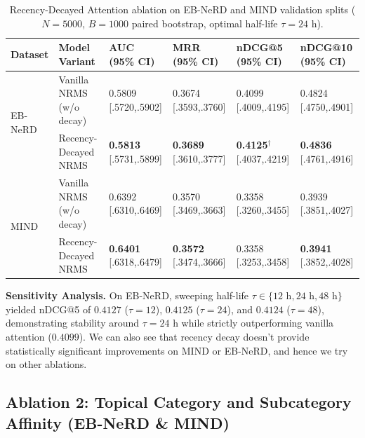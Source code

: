 \documentclass[11pt,a4paper]{article}
\begin{document}
\begin{table}[h!]
  \centering
  \caption{Recency-Decayed Attention ablation on EB-NeRD and MIND validation splits ($N{=}5000$, $B{=}1000$ paired bootstrap, optimal half-life $\tau = 24\text{ h}$).}
  \label{tab:recency_results}
  \vspace{-2pt}
  \small\setlength{\tabcolsep}{3pt}
  \begin{tabularx}{\linewidth}{l l X X X X}
    \toprule
    \textbf{Dataset} & \textbf{Model Variant} & \textbf{AUC (95\% CI)} & \textbf{MRR (95\% CI)} & \textbf{nDCG@5 (95\% CI)} & \textbf{nDCG@10 (95\% CI)} \\
    \midrule
    \multirow{2}{*}{EB-NeRD} 
      & Vanilla NRMS (w/o decay) & 0.5809 [.5720,.5902] & 0.3674 [.3593,.3760] & 0.4099 [.4009,.4195] & 0.4824 [.4750,.4901] \\
      & Recency-Decayed NRMS     & \textbf{0.5813} [.5731,.5899] & \textbf{0.3689} [.3610,.3777] & \textbf{0.4125}$^\dagger$ [.4037,.4219] & \textbf{0.4836} [.4761,.4916] \\
    \midrule
    \multirow{2}{*}{MIND} 
      & Vanilla NRMS (w/o decay) & 0.6392 [.6310,.6469] & 0.3570 [.3469,.3663] & 0.3358 [.3260,.3455] & 0.3939 [.3851,.4027] \\
      & Recency-Decayed NRMS     & \textbf{0.6401} [.6318,.6479] & \textbf{0.3572} [.3474,.3666] & 0.3358 [.3253,.3458] & \textbf{0.3941} [.3852,.4028] \\
    \bottomrule
  \end{tabularx}
\end{table}

\textbf{Sensitivity Analysis.} On EB-NeRD, sweeping half-life $\tau \in \{12\text{ h}, 24\text{ h}, 48\text{ h}\}$ yielded nDCG@5 of $0.4127$ ($\tau{=}12$), $0.4125$ ($\tau{=}24$), and $0.4124$ ($\tau{=}48$), demonstrating stability around $\tau{=}24\text{ h}$ while strictly outperforming vanilla attention ($0.4099$).
We can also see that recency decay doesn't provide statistically significant improvements on MIND or EB-NeRD, and hence we try on other ablations. 

\subsection{Ablation 2: Topical Category and Subcategory Affinity (EB-NeRD \& MIND)}
\label{sec:ablation_affinity}
\end{document}
